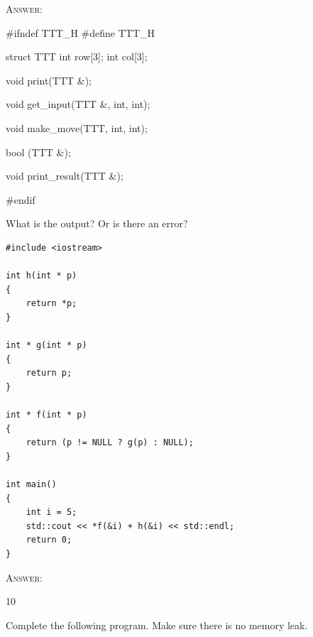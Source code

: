 \textsc{Answer:}\vspace{-2mm}
\begin{answercode}
#ifndef TTT_H
#define TTT_H

struct TTT
{
int row[3];
int col[3];
}

void print(TTT &);

void get_input(TTT &, int, int);

void make_move(TTT, int, int);

bool (TTT &);

void print_result(TTT &);

#endif
\end{answercode}

\newpage
\nextq
What is the output? Or is there an error?
\begin{Verbatim}[frame=single,fontsize=\small]
#include <iostream>

int h(int * p)
{
    return *p;
}

int * g(int * p)
{
    return p;
}

int * f(int * p)
{
    return (p != NULL ? g(p) : NULL);
}

int main()
{
    int i = 5;
    std::cout << *f(&i) + h(&i) << std::endl;
    return 0;
}
\end{Verbatim}

\textsc{Answer:}\vspace{-2mm}
\begin{answercode}
10
\end{answercode}

\newpage
\nextq
Complete the following program. Make sure there is no memory leak.

